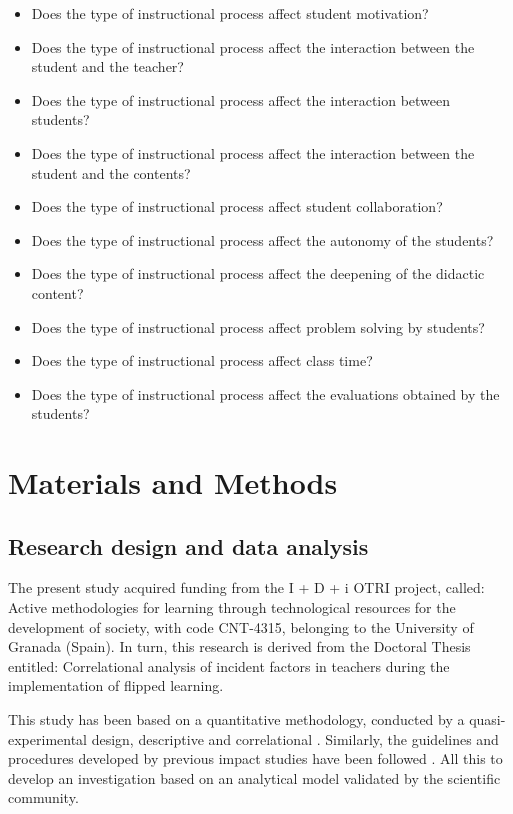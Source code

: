 \documentclass[english]{textolivre}
\begin{document}
\begin{itemize}
    \item Does the type of instructional process affect student motivation?
    \item Does the type of instructional process affect the interaction between the student and the teacher?
    \item Does the type of instructional process affect the interaction between students?
    \item Does the type of instructional process affect the interaction between the student and the contents?
    \item Does the type of instructional process affect student collaboration?
    \item Does the type of instructional process affect the autonomy of the students?
    \item Does the type of instructional process affect the deepening of the didactic content?
    \item Does the type of instructional process affect problem solving by students?
    \item Does the type of instructional process affect class time?
    \item Does the type of instructional process affect the evaluations obtained by the students?
\end{itemize}

\section{Materials and Methods}
\subsection{Research design and data analysis}
The present study acquired funding from the I + D + i OTRI project, called: Active methodologies for learning through technological resources for the development of society, with code CNT-4315, belonging to the University of Granada (Spain). In turn, this research is derived from the Doctoral Thesis entitled: Correlational analysis of incident factors in teachers during the implementation of flipped learning.

This study has been based on a quantitative methodology, conducted by a quasi-experimental design, descriptive and correlational \cite{hernandezfernandezbaptista2014, rodriguez2011}. Similarly, the guidelines and procedures developed by previous impact studies have been followed \cite{lopeznunez+lopezbelmonte+morenoguerrero+pozosanchez2020}. %
All this to develop an investigation based on an analytical model validated by the scientific community.
\end{document}
